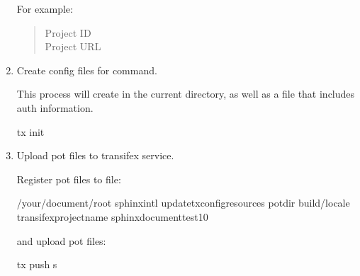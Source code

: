 \documentclass[letterpaper,10pt,english]{sphinxmanual}
\begin{document}
\begin{enumerate}
For example:
\begin{quote}\begin{description}
\item[{Project ID}] \leavevmode
{}

\item[{Project URL}] \leavevmode
{}

\end{description}\end{quote}

\item {} 
Create config files for  command.

This process will create  in the current directory, as well as
a  file that includes auth information.

\begin{sphinxVerbatim}[commandchars=\\\{\}]
 tx init
\end{sphinxVerbatim}

\item {} 
Upload pot files to transifex service.

Register pot files to  file:

\begin{sphinxVerbatim}[commandchars=\\\{\}]
  /your/document/root
 sphinx\PYGZhy{}intl update\PYGZhy{}txconfig\PYGZhy{}resources \PYGZhy{}\PYGZhy{}pot\PYGZhy{}dir \PYGZus{}build/locale 
  \PYGZhy{}\PYGZhy{}transifex\PYGZhy{}project\PYGZhy{}name sphinx\PYGZhy{}document\PYGZhy{}test\PYGZus{}1\PYGZus{}0
\end{sphinxVerbatim}

and upload pot files:

\begin{sphinxVerbatim}[commandchars=\\\{\}]
 tx push \PYGZhy{}s
\end{sphinxVerbatim}


\end{enumerate}
\end{document}
